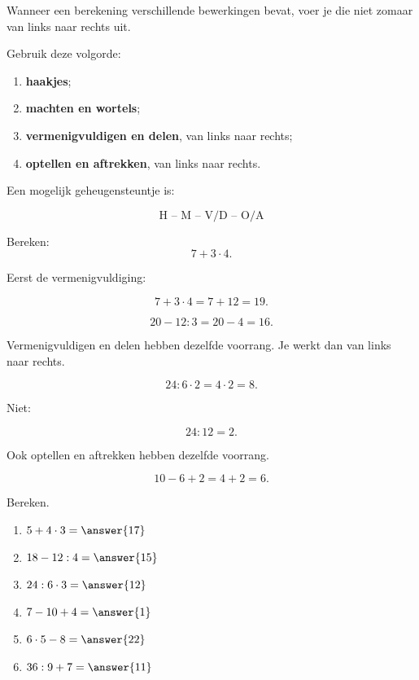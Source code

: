\documentclass{ximera}
\begin{document}
Wanneer een berekening verschillende bewerkingen bevat, voer je die niet zomaar
van links naar rechts uit.

Gebruik deze volgorde:

\begin{enumerate}
    \item \textbf{haakjes};
    \item \textbf{machten en wortels};
    \item \textbf{vermenigvuldigen en delen}, van links naar rechts;
    \item \textbf{optellen en aftrekken}, van links naar rechts.
\end{enumerate}

Een mogelijk geheugensteuntje is:

\[
\boxed{\text{H -- M -- V/D -- O/A}}
\]


\begin{example}
Bereken:
\[
7+3\cdot 4.
\]

Eerst de vermenigvuldiging:

\[
7+3\cdot4
=
7+12
=
19.
\]
\end{example}


\begin{example}
\[
20-12:3
=
20-4
=
16.
\]
\end{example}


Vermenigvuldigen en delen hebben dezelfde voorrang. Je werkt dan van links naar
rechts.

\begin{example}
\[
24:6\cdot2
=
4\cdot2
=
8.
\]

Niet:

\[
24:12=2.
\]
\end{example}

Ook optellen en aftrekken hebben dezelfde voorrang.

\begin{example}
\[
10-6+2
=
4+2
=
6.
\]
\end{example}

\begin{exercise}
Bereken.

\begin{enumerate}
    \item $5+4\cdot3=\answer{17}$
    \item $18-12:4=\answer{15}$
    \item $24:6\cdot3=\answer{12}$
    \item $7-10+4=\answer{1}$
    \item $6\cdot5-8=\answer{22}$
    \item $36:9+7=\answer{11}$
\end{enumerate}
\end{exercise}
\end{document}
